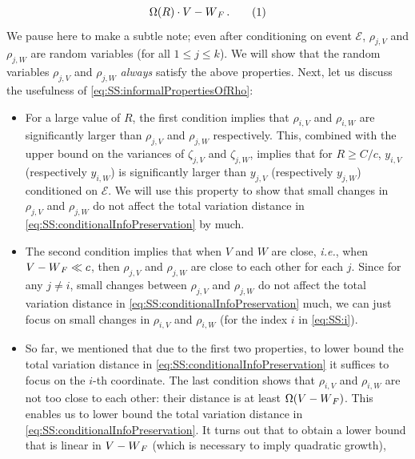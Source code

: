 \documentclass[11pt,letterpaper]{article}
\theoremstyle{plain}
\theoremstyle{definition}
\theoremstyle{remark}
\newcommand{\yesnum}{\addtocounter{equation}{1}\tag{\theequation}}
\let\norm\relax
\newcommand{\norm}[1]{\ensuremath{\left\lVert #1 \right\rVert}}
\newcommand{\evE}{\ensuremath{\mathscr{E}}}
\newcommand{\ie}{\emph{i.e.}}
\begin{document}
{{\begin{align*}
\begin{split}
                    \Omega({R})\cdot \norm{V-W}_F\,.
                \end{split}
                \yesnum\label{eq:SS:informalPropertiesOfRho}
            \end{align*}   
            We pause here to make a subtle note; even after conditioning on event $\evE$, $\rho_{j, V}$ and $\rho_{j, W}$ are random variables (for all $1\leq j\leq k$).
            We will show that the random variables $\rho_{j, V}$ and $\rho_{j, W}$ \textit{always} satisfy the above properties.
            Next, let us discuss the usefulness of \cref{eq:SS:informalPropertiesOfRho}:
            \begin{itemize}
                \item 
                    For a large value of $R$, the first condition implies that $\rho_{i,V}$ and $\rho_{i,W}$ are significantly larger than $\rho_{j,V}$ and $\rho_{j,W}$ respectively.
                    This, combined with the upper bound on the variances of $\zeta_{j,V}$ and $\zeta_{j,W}$, implies that for $R\geq C/c$, $y_{i,V}$ (respectively $y_{i,W}$) is significantly larger than $y_{j,V}$ (respectively $y_{j,W}$) conditioned on $\evE$.
                    We will use this property to show that small changes in $\rho_{j,V}$ and $\rho_{j,W}$ do not affect the total variation distance in \cref{eq:SS:conditionalInfoPreservation} by much.
                    \item The second condition implies that when $V$ and $W$ are close, \ie{}, when $\norm{V-W}_F\ll c$, then $\rho_{j,V}$ and $\rho_{j,W}$ are close to each other for each $j$.
                    Since for any $j\neq i$, small changes between $\rho_{j,V}$ and $\rho_{j,W}$ do not affect the total variation distance in \cref{eq:SS:conditionalInfoPreservation} much, we can just focus on small changes in $\rho_{i,V}$ and $\rho_{i,W}$ (for the index $i$ in \cref{eq:SS:i}).
                    \item So far, we mentioned that due to the first two properties, to lower bound the total variation distance in \cref{eq:SS:conditionalInfoPreservation} it suffices to focus on the $i$-th coordinate.
                    The last condition shows that $\rho_{i,V}$ and $\rho_{i,W}$ are not too close to each other: their distance is at least $\Omega(\norm{V-W}_F)$.
                    This enables us to lower bound the total variation distance in \cref{eq:SS:conditionalInfoPreservation}.
                    It turns out that to obtain a lower bound that is linear in $\norm{V-W}_F$ (which is necessary to imply quadratic growth),

\end{itemize}}}
\end{document}
